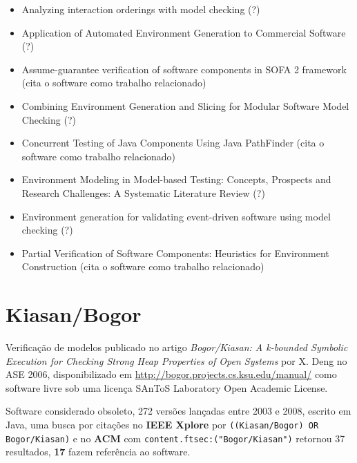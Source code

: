 \begin{itemize}
\item Analyzing interaction orderings with model checking (?)
\item Application of Automated Environment Generation to Commercial Software (?)
\item Assume-guarantee verification of software components in SOFA 2 framework (cita o software como trabalho relacionado)
\item Combining Environment Generation and Slicing for Modular Software Model Checking (?)
\item Concurrent Testing of Java Components Using Java PathFinder (cita o software como trabalho relacionado)
\item Environment Modeling in Model-based Testing: Concepts, Prospects and Research Challenges: A Systematic Literature Review (?)
\item Environment generation for validating event-driven software using model checking (?)
\item Partial Verification of Software Components: Heuristics for Environment Construction (cita o software como trabalho relacionado)
\end{itemize}

\section{Kiasan/Bogor}

Verificação de modelos
publicado no artigo {\it Bogor/Kiasan: A k-bounded Symbolic Execution for Checking Strong Heap Properties of Open Systems}
por X. Deng
no ASE 2006,
disponibilizado em \url{http://bogor.projects.cs.ksu.edu/manual/}
como software livre
sob uma licença SAnToS Laboratory Open Academic License.

Software considerado obsoleto,
272 versões lançadas
entre 2003 e 2008,
escrito em Java,
uma busca por citações no {\bf IEEE Xplore} por
\texttt{((Kiasan/Bogor) OR Bogor/Kiasan)}
e no {\bf ACM} com
\texttt{content.ftsec:("Bogor/Kiasan")}
retornou
37 resultados,
{\bf 17} fazem referência ao software.


